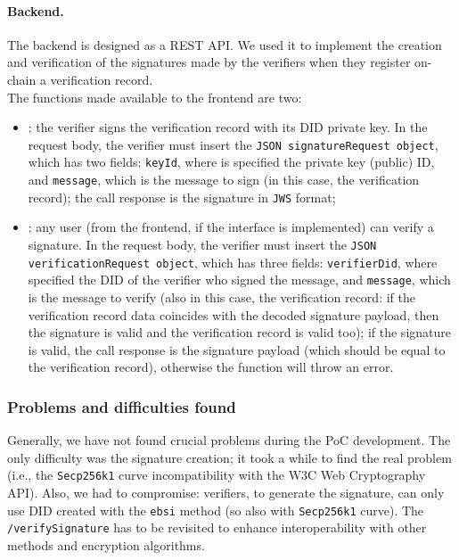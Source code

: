 \paragraph{Backend.}
The backend is designed as a REST API. We used it to implement the creation 
and verification of the signatures made by the verifiers when they register 
on-chain a verification record.
\vspace{0.3cm}\\
The functions made available to the frontend are two:
\begin{itemize}
    \item {}: the verifier signs the verification record
    with its DID private key. In the request body, the verifier must insert the
    \texttt{JSON signatureRequest object}, which has two fields: \texttt{keyId},
    where is specified the private key (public) ID, and \texttt{message},
    which is the message to sign (in this case, the verification record);
    the call response is the signature in \texttt{JWS} format;
    \item {}: any user (from the frontend, if the
    interface is implemented) can verify a signature. In the request body, the
    verifier must insert the \texttt{JSON verificationRequest object}, which has
    three fields: \texttt{verifierDid}, where specified the DID of the
    verifier who signed the message, and \texttt{message}, which is the
    message to verify (also in this case, the verification record: if the
    verification record data coincides with the decoded signature payload,
    then the signature is valid and the verification record is valid too);
    if the signature is valid, the call response is the signature payload (which
    should be equal to the verification record), otherwise the function
    will throw an error.
\end{itemize}

\subsubsection{Problems and difficulties found}
Generally, we have not found crucial problems during the PoC development. The only 
difficulty was the signature creation; it took a while to find the real 
problem (i.e., the \texttt{Secp256k1} curve incompatibility with the W3C Web 
Cryptography API). Also, we had to compromise: verifiers, to generate the signature, 
can only use DID created with the \texttt{ebsi} method (so also with \texttt{Secp256k1}
curve). The \texttt{/verifySignature} has to be revisited to enhance interoperability
with other methods and encryption algorithms.

